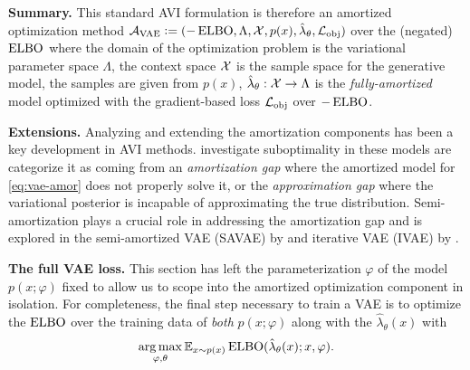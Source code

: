 \documentclass[twoside,11pt]{article}
\begin{document}
\textbf{Summary.} This standard AVI formulation is therefore an amortized optimization method
${\mathcal{A}}_{\rm VAE}\vcentcolon= (-\operatorname{ELBO}, \Lambda, {\mathcal{X}}, p(x), \hat \lambda_\theta, {\mathcal{L}}_{\rm obj})$
over the (negated) $\operatorname{ELBO}$ where the domain of the optimization
problem is the variational parameter space $\Lambda$,
the context space ${\mathcal{X}}$ is the sample space for the
generative model,
the samples are given from $p(x)$,
$\hat\lambda_\theta: {\mathcal{X}}\rightarrow\Lambda$ is the
\emph{fully-amortized} model optimized with the
gradient-based loss ${\mathcal{L}}_{\rm obj}$ over $-\operatorname{ELBO}$.

\textbf{Extensions.}
Analyzing and extending the amortization components
has been a key development in AVI methods.
\citet{cremer2018inference} investigate suboptimality in
these models are categorize it as coming from an
\emph{amortization gap} where the amortized model for
\cref{eq:vae-amor} does not properly solve it,
or the \emph{approximation gap} where the variational
posterior is incapable of approximating the true distribution.
Semi-amortization plays a crucial role in addressing the
amortization gap and is explored in the
semi-amortized VAE (SAVAE) by \citet{kim2018semi}
and iterative VAE (IVAE) by \citet{marino2018iterative}.

\textbf{The full VAE loss.}
This section has left the parameterization
$\varphi$ of the model $p(x; \varphi)$
fixed to allow us to scope into the
amortized optimization component in isolation.
For completeness, the final step necessary to train
a VAE is to optimize the $\operatorname{ELBO}$ over the training
data of \emph{both} $p(x; \varphi)$ along with
the $\hat \lambda_\theta(x)$ with
\begin{equation}
  \operatorname*{arg\,max}_{\varphi,\theta} \operatorname{\mathbb{E}}_{x\sim p(x)} \operatorname{ELBO}(\hat \lambda_\theta(x); x, \varphi).
  \label{eq:vae-full}
\end{equation}
\end{document}
